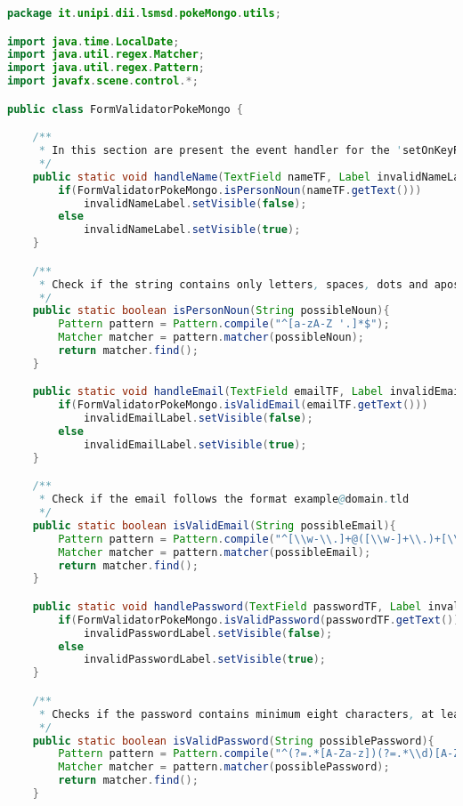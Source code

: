 \begin{lstlisting}[language=Java, caption=Java example]
    package it.unipi.dii.lsmsd.pokeMongo.utils;

import java.time.LocalDate;
import java.util.regex.Matcher;
import java.util.regex.Pattern;
import javafx.scene.control.*;

public class FormValidatorPokeMongo {

    /**
     * In this section are present the event handler for the 'setOnKeyReleased' event in the form.
     */
    public static void handleName(TextField nameTF, Label invalidNameLabel){
        if(FormValidatorPokeMongo.isPersonNoun(nameTF.getText()))
            invalidNameLabel.setVisible(false);
        else
            invalidNameLabel.setVisible(true);
    }

    /**
     * Check if the string contains only letters, spaces, dots and apostrophes.
     */
    public static boolean isPersonNoun(String possibleNoun){
        Pattern pattern = Pattern.compile("^[a-zA-Z '.]*$");
        Matcher matcher = pattern.matcher(possibleNoun);
        return matcher.find();
    }

    public static void handleEmail(TextField emailTF, Label invalidEmailLabel){
        if(FormValidatorPokeMongo.isValidEmail(emailTF.getText()))
            invalidEmailLabel.setVisible(false);
        else
            invalidEmailLabel.setVisible(true);
    }

    /**
     * Check if the email follows the format example@domain.tld
     */
    public static boolean isValidEmail(String possibleEmail){
        Pattern pattern = Pattern.compile("^[\\w-\\.]+@([\\w-]+\\.)+[\\w-]{2,4}$");
        Matcher matcher = pattern.matcher(possibleEmail);
        return matcher.find();
    }

    public static void handlePassword(TextField passwordTF, Label invalidPasswordLabel){
        if(FormValidatorPokeMongo.isValidPassword(passwordTF.getText()))
            invalidPasswordLabel.setVisible(false);
        else
            invalidPasswordLabel.setVisible(true);
    }

    /**
     * Checks if the password contains minimum eight characters, at least one letter and one number.
     */
    public static boolean isValidPassword(String possiblePassword){
        Pattern pattern = Pattern.compile("^(?=.*[A-Za-z])(?=.*\\d)[A-Za-z\\d]{8,}$");
        Matcher matcher = pattern.matcher(possiblePassword);
        return matcher.find();
    }


\end{lstlisting}
